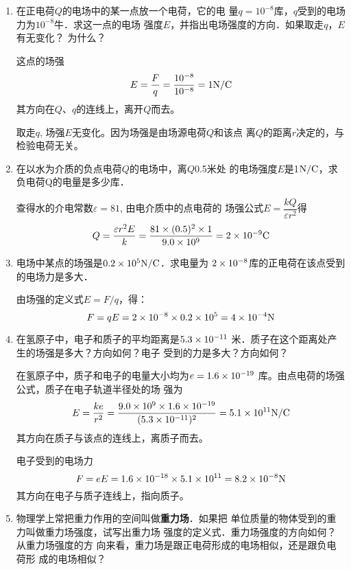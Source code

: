 \begin{enumerate}
	\item 在正电荷$Q$的电场中的某一点放一个电荷，它的电
	量$q=10^{-8}$库，$q$受到的电场力为$10^{-8}$牛．求这一点的电场
	强度$E$，并指出电场强度的方向．如果取走$q$，$E$有无变化？
	为什么？

    \begin{solution}
        这点的场强
\[E=\frac{F}{q}=\frac{10^{-8}}{10^{-8}}=1{\rm N/C}\]
其方向在$Q$、$q$的连线上，离开$Q$而去。

取走$q$, 场强$E$无变化。因为场强是由场源电荷$Q$和该点
离$Q$的距离$r$决定的，与检验电荷无关。
    \end{solution}
    
	\item 在以水为介质的负点电荷$Q$的电场中，离$Q$0.5米处
	的电场强度$E$是1$\text{N}/\text{C}$，求负电荷Q的电量是多少库．

    \begin{solution}
        查得水的介电常数$\varepsilon=81$, 由电介质中的点电荷的
        场强公式$E=\dfrac{kQ}{\varepsilon r^2}$得
   \[     Q=\frac{\varepsilon r^2 E}{k}=\frac{81\times(0.5)^2\times1}{9.0\times10^9}
 =2\times10^{-9}{\rm C}\]
    \end{solution}
    
	\item 电场中某点的场强是$0.2\times10^5\text{N}/\text{C}$．求电量为
	$2\times10^{-8}$库的正电荷在该点受到的电场力是多大．

    \begin{solution}
        由场强的定义式$E=F/q$，得：
 \[       F=qE=2\times10^{-8}\times0.2\times10^5=4\times10^{-4}{\rm N}\]
    \end{solution}
    
	\item 在氢原子中，电子和质子的平均距离是$5.3\times10^{-11}$
	米．质子在这个距离处产生的场强是多大？方向如何？电子
	受到的力是多大？方向如何？

    \begin{solution}
        在氢原子中，质子和电子的电量大小均为$e=1.6\times10^{-19}$
        库。由点电荷的场强公式，质子在电子轨道半径处的场
        强为
\[E=\frac{ke}{r^2}=\frac{9.0\times 10^9\times 1.6\times 10^{-19}}{(5.3\times 10^{-11})^2}=5.1\times 10^{11}{\rm N/C}\]
其方向在质子与该点的连线上，离质子而去。

电子受到的电场力
\[F=eE=1.6\times10^{-18}\times5.1\times10^{11}=8.2\times10^{-8}{\rm N}\]
其方向在电子与质子连线上，指向质子。
    \end{solution}
    
	\item 物理学上常把重力作用的空间叫做\textbf{重力场}．如果把
	单位质量的物体受到的重力叫做重力场强度，试写出重力场
	强度的定义式．重力场强度的方向如何？从重力场强度的方
	向来看，重力场是跟正电荷形成的电场相似，还是跟负电荷形
成的电场相似？


\end{enumerate}
